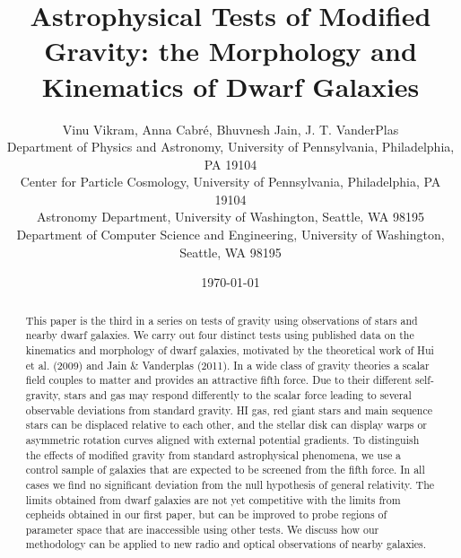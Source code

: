 \documentclass[useAMS,usenatbib,twocolumn]{mn2e}
\begin{document}
\title[Astrophysical Tests of Modified Gravity]{Astrophysical Tests
of Modified Gravity: the Morphology and Kinematics of Dwarf Galaxies} 
\author[Vikram, V. {\it et al.}]{Vinu Vikram, Anna Cabr\'e, Bhuvnesh Jain, J.
T. VanderPlas\\
  Department of Physics and Astronomy, University of Pennsylvania, 
  Philadelphia, PA 19104\\
  Center for Particle Cosmology, University of Pennsylvania, 
  Philadelphia, PA 19104\\
  Astronomy Department, University of Washington,
  Seattle, WA 98195\\
  Department of Computer Science and Engineering, University of Washington,
  Seattle, WA 98195
}

\date{\today}
\maketitle


\begin{abstract}
This paper is the third in a series on tests of gravity using observations of 
stars and nearby
dwarf galaxies. We carry out four distinct tests using published data on the
kinematics
and morphology of dwarf galaxies, motivated by the theoretical work of
Hui et al. (2009) and Jain \& Vanderplas (2011). In a wide class of
gravity theories a scalar field couples to matter and provides an attractive
fifth force. Due to their different self-gravity,
stars and gas may respond differently to the scalar force leading
to several observable deviations from standard gravity.  
HI gas, red giant stars and main sequence stars
can be displaced relative to each other,
and the stellar disk can display warps or asymmetric rotation curves
aligned with external potential gradients.  
To distinguish the effects of modified
gravity from standard astrophysical phenomena, we use a control sample of
galaxies that are expected to be screened from the fifth force.
In all cases we find no significant deviation
from the null hypothesis of general relativity. The limits obtained from dwarf galaxies are not yet competitive with the limits from cepheids obtained in our first paper, but
can be improved to probe regions of parameter space that are inaccessible using
other tests. We discuss how our methodology can be applied to 
new radio and optical observations of nearby galaxies.
\nocite{hui09, bhuvjake2011}
\end{abstract}
\end{document}
